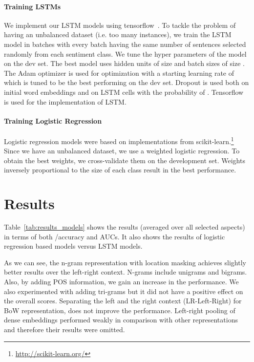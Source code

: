 \documentclass[11pt]{article}
\begin{document}
    \paragraph{Training LSTMs} 
    We implement our LSTM models using tensorflow~\cite{tensorflow2015_whitepaper}. To tackle the problem of having an unbalanced dataset (i.e. too many  instances), we train the LSTM model in batches with every batch having the same number of sentences selected randomly from each sentiment class. We tune the hyper parameters of the model on the dev set. The best model uses hidden units of size  and batch sizes of size . The Adam optimizer is used for optimization with a starting learning rate of  which is tuned to be the best performing on the dev set. Dropout is used both on initial word embeddings and on LSTM cells with the probability of . Tensorflow~\cite{tensorflow2015_whitepaper} is used for the implementation of LSTM.
    \paragraph{Training Logistic Regression}
    Logistic regression models were based on implementations from scikit-learn.\footnote{\url{http://scikit-learn.org/}} Since we have an unbalanced dataset, we use a weighted logistic regression. To obtain the best weights, we cross-validate them on the development set. Weights inversely proportional to the size of each class result in the best performance.
\section{Results}
    Table~\ref{tab:results_models} shows the results (averaged over all selected aspects) in terms of both /accuracy and AUCs. It also shows the results of logistic regression based models versus LSTM models. 
    
    As we can see, the n-gram representation with location masking achieves slightly better results over the left-right context. N-grams include unigrams and bigrams. Also, by adding POS information, we gain an increase in the performance. We also experimented with adding tri-grams but it did not have a positive effect on the overall scores. Separating the left and the right context (LR-Left-Right) for BoW representation, does not improve the performance. Left-right pooling of dense embeddings performed weakly in comparison with other representations and therefore their results were omitted. 
\end{document}
